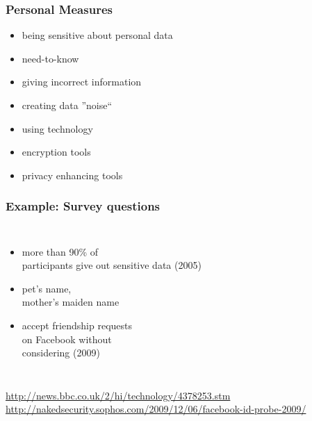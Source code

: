 \documentclass[dvipsnames]{beamer}
\theoremstyle{plain}
\begin{document}
\begin{frame}
  \frametitle{Personal Measures}

  \begin{itemize}
    \item being sensitive about personal data
    \item need-to-know
    \item giving incorrect information
    \item creating data ''noise``

    \pause
    \bigskip
    \item using technology
    \item encryption tools
    \item privacy enhancing tools
  \end{itemize}
\end{frame}

\begin{frame}
  \frametitle{Example: Survey questions}

  \begin{columns}

    \begin{itemize}
      \item more than 90\% of\\
        participants give out
        sensitive data (2005)
      \item pet's name,\\
        mother's maiden name

      \bigskip
      \item accept friendship requests\\
        on Facebook without\\
        considering (2009)
    \end{itemize}
  \end{columns}

  \medskip
  \tiny{\url{http://news.bbc.co.uk/2/hi/technology/4378253.stm}}\\
  \tiny{\url{http://nakedsecurity.sophos.com/2009/12/06/facebook-id-probe-2009/}}\\
\end{frame}
\end{document}
